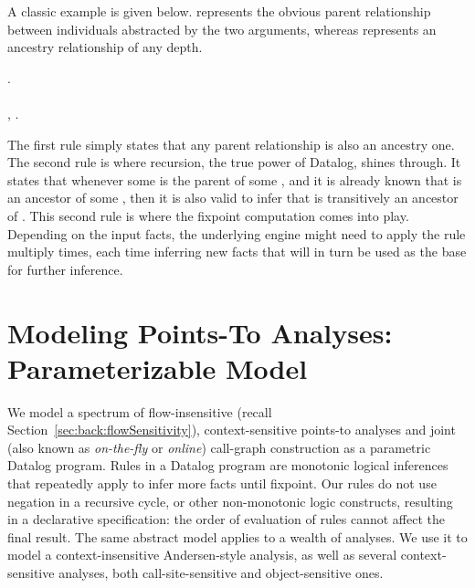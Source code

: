 A classic example is given below.  represents the obvious parent relationship between individuals abstracted by the two arguments, whereas  represents an ancestry relationship of any depth. 

\begin{datalog}
 \dlIf{} . \\
\\
 \dlIf{} , .
\end{datalog}

The first rule simply states that any parent relationship is also an ancestry one. The second rule is where recursion, the true power of Datalog, shines through. It states that whenever some  is the parent of some , and it is already known that  is an ancestor of some , then it is also valid to infer that  is transitively an ancestor of . This second rule is where the fixpoint computation comes into play. Depending on the input facts, the underlying engine might need to apply the rule multiply times, each time inferring new facts that will in turn be used as the base for further inference.


\section{Modeling Points-To Analyses: Parameterizable Model}
\label{sec:back:model}

We model a spectrum of flow-insensitive (recall Section~\ref{sec:back:flowSensitivity}), context-sensitive points-to analyses and joint (also known as \emph{on-the-fly} or \emph{online}) call-graph construction as a parametric Datalog program. Rules in a Datalog program are monotonic logical inferences that repeatedly apply to infer more facts until fixpoint. Our rules do not use negation in a recursive cycle, or other non-monotonic logic constructs, resulting in a declarative specification: the order of evaluation of rules cannot affect the final result. The same abstract model applies to a wealth of analyses. We use it to model a context-insensitive Andersen-style \cite{thesis:Andersen} analysis, as well as several context-sensitive analyses, both call-site-sensitive and object-sensitive ones.

